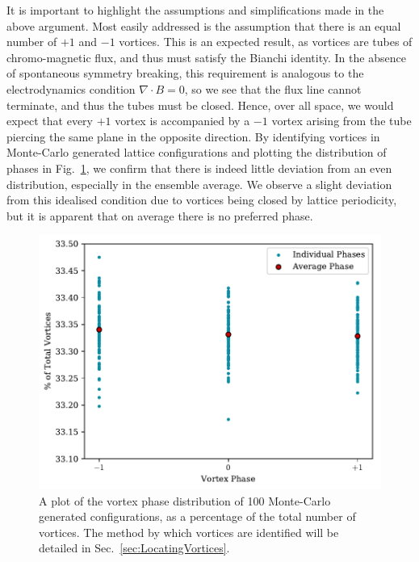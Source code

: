 It is important to highlight the assumptions and simplifications made in the above argument. Most easily addressed is the assumption that there is an equal number of $+1$ and $-1$ vortices. This is an expected result, as vortices are tubes of chromo-magnetic flux, and thus must satisfy the Bianchi identity. In the absence of spontaneous symmetry breaking, this requirement is analogous to the electrodynamics condition $\nabla \cdot B = 0$, so we see that the flux line cannot terminate, and thus the tubes must be closed. Hence, over all space, we would expect that every $+1$ vortex is accompanied by a $-1$ vortex arising from the tube piercing the same plane in the opposite direction. By identifying vortices in Monte-Carlo generated lattice configurations and plotting the distribution of phases in Fig.~\ref{fig:VortexDistribution}, we confirm that there is indeed little deviation from an even distribution, especially in the ensemble average. We observe a slight deviation from this idealised condition due to vortices being closed by lattice periodicity, but it is apparent that on average there is no preferred phase.\\
%
\begin{figure}[htb!]
\includegraphics{./VortexDistribution.pdf}
\caption[A plot of the vortex phase distribution of 100 Monte-Carlo generated configurations.]{\label{fig:VortexDistribution}A plot of the vortex phase distribution of 100 Monte-Carlo generated configurations, as a percentage of the total number of vortices. The method by which vortices are identified will be detailed in Sec.~\ref{sec:LocatingVortices}.}
\end{figure}
%

